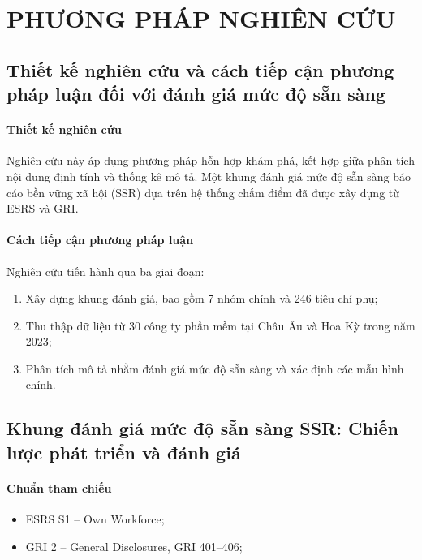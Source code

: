 \chapter{PHƯƠNG PHÁP NGHIÊN CỨU}

\section{Thiết kế nghiên cứu và cách tiếp cận phương pháp luận đối với đánh giá mức độ sẵn sàng}

\subsubsection{Thiết kế nghiên cứu}
Nghiên cứu này áp dụng phương pháp hỗn hợp khám phá, kết hợp giữa phân tích nội dung định tính và thống kê mô tả.
Một khung đánh giá mức độ sẵn sàng báo cáo bền vững xã hội (SSR) dựa trên hệ thống chấm điểm đã được xây dựng từ ESRS và GRI.

\subsubsection{Cách tiếp cận phương pháp luận}
Nghiên cứu tiến hành qua ba giai đoạn:
\begin{enumerate}
\item Xây dựng khung đánh giá, bao gồm 7 nhóm chính và 246 tiêu chí phụ;
\item Thu thập dữ liệu từ 30 công ty phần mềm tại Châu Âu và Hoa Kỳ trong năm 2023;
\item Phân tích mô tả nhằm đánh giá mức độ sẵn sàng và xác định các mẫu hình chính.
\end{enumerate}

\section{Khung đánh giá mức độ sẵn sàng SSR: Chiến lược phát triển và đánh giá}

\subsubsection{Chuẩn tham chiếu}
\begin{itemize}
\item ESRS S1 – Own Workforce;
\item GRI 2 – General Disclosures, GRI 401–406;
\end{itemize}

